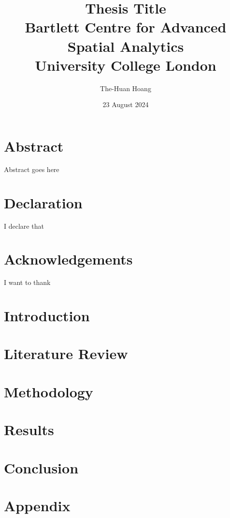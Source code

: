 \documentclass[12pt,twoside]{report}
\title{
    {Thesis Title}\\
    {\large Bartlett Centre for Advanced Spatial Analytics}\\
    {\large University College London}\\
}
\author{The-Huan Hoang}
\date{23 August 2024}
\begin{document}
\maketitle

\chapter*{Abstract}
Abstract goes here

\chapter*{Declaration}
I declare that

\chapter*{Acknowledgements}
I want to thank

\tableofcontents

\listoffigures

\listoftables

\chapter{Introduction}


\chapter{Literature Review}


\chapter{Methodology}


\chapter{Results}


\chapter{Conclusion}


\appendix
\chapter{Appendix}

\end{document}
